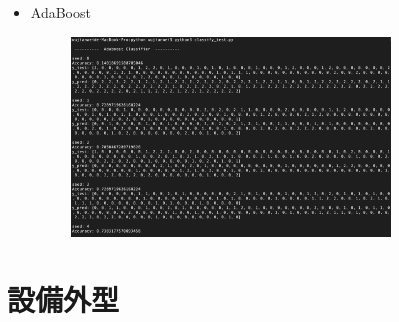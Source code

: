 \begin{itemize}
\begin{figure}[H]
	\end{figure}
	\item AdaBoost
	\begin{figure}[H]
		\centering
		\includegraphics[width=0.8\textwidth]{pic/Adaboost.png}
	\end{figure}
\end{itemize}

\section{設備外型}
